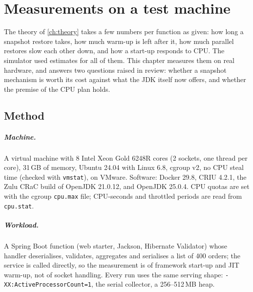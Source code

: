 \providecommand{\chapref}[2]{\cref{#1}}

\chapter{Measurements on a test machine}
\label{ch:measure}

The theory of \chapref{ch:theory}{Chapter~4} takes a few numbers per function as given: how long a
snapshot restore takes, how much warm-up is left after it, how much parallel restores slow each
other down, and how a start-up responds to CPU. The simulator used estimates for all of them. This
chapter measures them on real hardware, and answers two questions raised in review: whether a
snapshot mechanism is worth its cost against what the JDK itself now offers, and whether the
premise of the CPU plan holds.

\section{Method}
\label{sec:m-method}

\paragraph{Machine.} A virtual machine with 8 Intel Xeon Gold 6248R cores (2 sockets, one thread
per core), 31\,GB of memory, Ubuntu 24.04 with Linux 6.8, cgroup v2, no CPU steal time (checked
with \texttt{vmstat}), on VMware. Software: Docker 29.8, CRIU 4.2.1, the Zulu CRaC build of
OpenJDK 21.0.12, and OpenJDK 25.0.4. CPU quotas are set with the cgroup \texttt{cpu.max} file;
CPU-seconds and throttled periods are read from \texttt{cpu.stat}.

\paragraph{Workload.} A Spring Boot function (web starter, Jackson, Hibernate Validator) whose
handler deserialises, validates, aggregates and serialises a list of 400 orders; the service is
called directly, so the measurement is of framework start-up and JIT warm-up, not of socket
handling. Every run uses the same serving shape: \texttt{-XX:ActiveProcessorCount=1}, the serial
collector, a 256--512\,MB heap.

